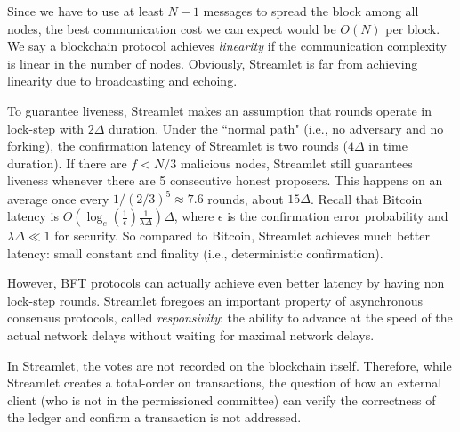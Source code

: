 \documentclass{article}
\newcommand{\pramod}[1]{{\color{red}
\footnotesize[Pramod: #1] }}
\begin{document}
Since we have to use at least $N-1$ messages to spread the block among all nodes, the best communication cost we can expect would be $O(N)$ per block. We say a blockchain protocol achieves {\it linearity} if the communication complexity  is linear in the number of nodes. Obviously, Streamlet is far from achieving linearity due to broadcasting and echoing. 

 To guarantee liveness, Streamlet makes an assumption that rounds operate in lock-step with $2\Delta$ duration. Under the ``normal path" (i.e., no adversary and no forking), the confirmation latency of Streamlet is two rounds ($4\Delta$ in time duration). If there are $f < N/3$ malicious nodes, Streamlet still guarantees liveness whenever there are 5 consecutive honest proposers. This happens on an average once every $1/(2/3)^5 \approx 7.6$ rounds, about $15\Delta$. Recall that Bitcoin latency is $O(\log_e(\frac{1}{\epsilon})\frac{1}{\lambda\Delta})\Delta$, where $\epsilon$ is the confirmation error probability and $\lambda\Delta \ll 1$ for security. So compared to Bitcoin, Streamlet achieves much better latency: small constant and finality (i.e., deterministic confirmation).

However, BFT protocols can actually achieve even better latency by having non lock-step rounds.
Streamlet foregoes an important property of asynchronous consensus protocols, called {\it responsivity}: the ability to advance at the speed of the actual network delays without waiting for maximal network delays.

 In Streamlet, the votes are not recorded on the blockchain itself. Therefore, while Streamlet creates a total-order on transactions, the question of how an external client (who is not in the permissioned committee) can verify the correctness of the ledger and confirm a transaction is not addressed. 





\end{document}
